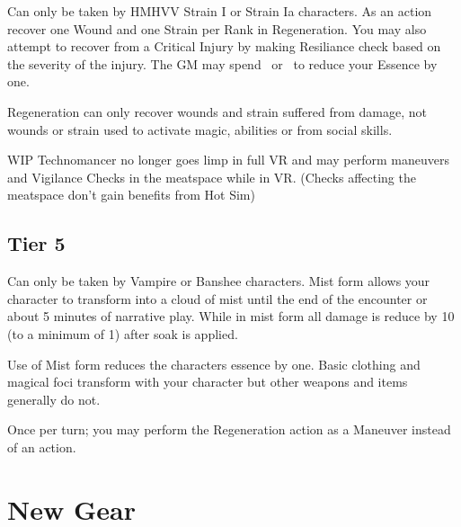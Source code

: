 \documentclass{book}
\begin{document}
\begin{multicols}{2}
 \label{regenerationtalet} Can only be taken by HMHVV Strain I or Strain Ia characters. As an action recover one Wound and one Strain per Rank in Regeneration. You may also attempt to recover from a Critical Injury by making Resiliance check based on the severity of the injury. The GM may spend \Threat \Threat \Threat\ or \Despair\ to reduce your Essence by one.

Regeneration can only recover wounds and strain suffered from damage, not wounds or strain used to activate magic, abilities or from social skills.

 WIP Technomancer no longer goes limp in full VR and may perform maneuvers and Vigilance Checks in the meatspace while in VR. (Checks affecting the meatspace don't gain benefits from Hot Sim)

\section{Tier 5}
 Can only be taken by Vampire or Banshee characters. Mist form allows your character to transform into a cloud of mist until the end of the encounter or about 5 minutes of narrative play. While in mist form all damage is reduce by 10 (to a minimum of 1) after soak is applied. 

Use of Mist form reduces the characters essence by one. Basic clothing and magical foci transform with your character but other weapons and items generally do not.

  
Once per turn; you may perform the Regeneration action as a Maneuver instead of an action.


\end{multicols}

\chapter{New Gear}
\end{document}
